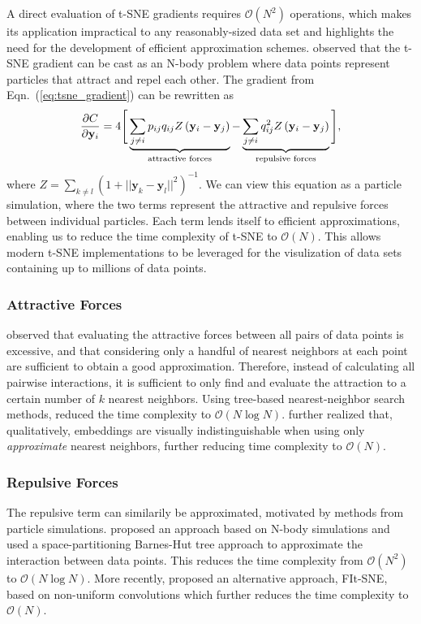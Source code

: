 \documentclass[article]{jss}
\begin{document}
A direct evaluation of t-SNE gradients requires $\mathcal{O}(N^2)$ operations,
which makes its application impractical to any reasonably-sized data set and
highlights the need for the development of efficient approximation schemes.
\citet{van2014accelerating} observed that the t-SNE gradient can be cast as an
N-body problem where data points represent particles that attract and repel each
other. The gradient from Eqn.~(\ref{eq:tsne_gradient}) can be rewritten as
\begin{equation}
\frac{\partial C}{\partial \mathbf{y}_i} = 4 \Bigg [
\underbrace{\sum_{j \neq i} p_{ij} q_{ij} Z \left ( \mathbf{y}_i - \mathbf{y}_j \right )}_{\text{attractive forces}}  -
\underbrace{\sum_{j \neq i} q_{ij}^2 Z \left ( \mathbf{y}_i - \mathbf{y}_j \right )}_{\text{repulsive forces}}
\Bigg ], \label{eq:grad_attr_rep} \notag
\end{equation}
where $Z = \sum_{k \neq l}\left ( 1 + || \mathbf{y}_k - \mathbf{y}_l ||^2 \right
)^{-1}$. We can view this equation as a particle simulation, where the
two terms represent the attractive and repulsive forces between individual
particles. Each term lends itself to efficient approximations, enabling us to
reduce the time complexity of t-SNE to $\mathcal{O}(N)$. This allows modern
t-SNE implementations to be leveraged for the visulization of data sets
containing up to millions of data points.

\subsubsection*{Attractive Forces}
\citet{van2014accelerating} observed that evaluating the attractive forces
between all pairs of data points is excessive, and that considering only a
handful of nearest neighbors at each point are sufficient to obtain a good
approximation. Therefore, instead of calculating all pairwise interactions, it
is sufficient to only find and evaluate the attraction to a certain number of
$k$ nearest neighbors. Using tree-based nearest-neighbor search methods,
\citet{van2014accelerating} reduced the time complexity to $\mathcal{O}(N \log
N)$. \citet{linderman2019fast} further realized that, qualitatively, embeddings
are visually indistinguishable when using only \textit{approximate} nearest
neighbors, further reducing time complexity to $\mathcal{O}(N)$.

\subsubsection*{Repulsive Forces}
The repulsive term can similarily be approximated, motivated by methods from
particle simulations. \citet{van2014accelerating} proposed an approach based on
N-body simulations and used a space-partitioning Barnes-Hut tree approach to
approximate the interaction between data points. This reduces the time
complexity from $\mathcal{O}(N^2)$ to $\mathcal{O}(N \log N)$. More recently,
\citet{linderman2019fast} proposed an alternative approach, FIt-SNE, based on
non-uniform convolutions which further reduces the time complexity to
$\mathcal{O}(N)$.
\end{document}
